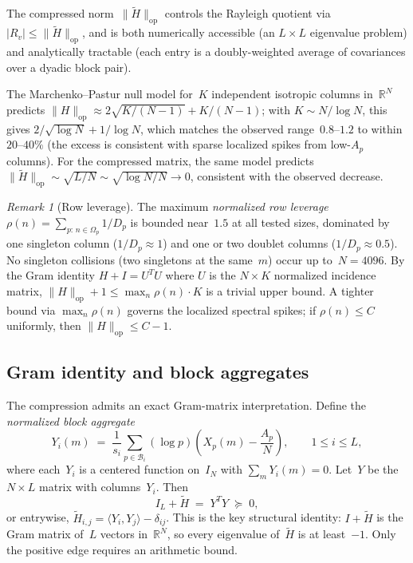 \documentclass[11pt]{article}
\theoremstyle{definition}
\theoremstyle{remark}
\newtheorem{remark}[theorem]{Remark}
\begin{document}
The compressed norm~$\|\tilde{H}\|_{\mathrm{op}}$
controls the Rayleigh quotient via
$|R_v| \le \|\tilde{H}\|_{\mathrm{op}}$,
and is both numerically accessible (an $L \times L$
eigenvalue problem) and analytically tractable
(each entry is a doubly-weighted average of
covariances over a dyadic block pair).

The Marchenko--Pastur null model
for~$K$ independent isotropic columns in~$\mathbb{R}^N$
predicts $\|H\|_{\mathrm{op}} \approx
2\sqrt{K/(N{-}1)} + K/(N{-}1)$;
with $K \sim N / \log N$, this gives
$2/\sqrt{\log N} + 1/\log N$,
which matches the observed range~$0.8$--$1.2$
to within~$20$--$40\%$ (the excess is consistent
with sparse localized spikes from low-$A_p$ columns).
For the compressed matrix, the same model predicts
$\|\tilde{H}\|_{\mathrm{op}} \sim \sqrt{L/N}
\sim \sqrt{\log N / N} \to 0$,
consistent with the observed decrease.

\begin{remark}[Row leverage]\label{rem:leverage}
The maximum \emph{normalized row leverage}
$\rho(n) = \sum_{p:\, n \in \Omega_p} 1/D_p$
is bounded near~$1.5$ at all tested sizes,
dominated by one singleton column ($1/D_p \approx 1$)
and one or two doublet columns ($1/D_p \approx 0.5$).
No singleton collisions (two singletons at the same~$m$)
occur up to~$N = 4096$.
By the Gram identity $H + I = U^T U$ where
$U$ is the $N \times K$ normalized incidence matrix,
$\|H\|_{\mathrm{op}} + 1 \le \max_n \rho(n) \cdot K$
is a trivial upper bound.
A tighter bound via $\max_n \rho(n)$ governs
the localized spectral spikes; if $\rho(n) \le C$
uniformly, then $\|H\|_{\mathrm{op}} \le C - 1$.
\end{remark}

\subsection{Gram identity and block aggregates}
\label{ssec:gram-identity}

The compression admits an exact Gram-matrix interpretation.
Define the \emph{normalized block aggregate}
\begin{equation}\label{eq:block-aggregate}
  Y_i(m) \;=\; \frac{1}{s_i}
  \sum_{p \in \mathcal{B}_i} (\log p)
  \left(X_p(m) - \frac{A_p}{N}\right),
  \qquad 1 \le i \le L,
\end{equation}
where each~$Y_i$ is a centered function on~$I_N$
with $\sum_m Y_i(m) = 0$.
Let~$Y$ be the $N \times L$ matrix with columns~$Y_i$.
Then
\begin{equation}\label{eq:gram-identity}
  \boxed{I_L + \tilde{H} \;=\; Y^T\!Y \;\succeq\; 0,}
\end{equation}
or entrywise, $\tilde{H}_{i,j} = \langle Y_i, Y_j \rangle
- \delta_{ij}$.
This is the key structural identity:
$I + \tilde{H}$ is the Gram matrix of~$L$ vectors
in~$\mathbb{R}^N$, so every eigenvalue of~$\tilde{H}$
is at least~$-1$.
Only the positive edge requires an arithmetic bound.
\end{document}
